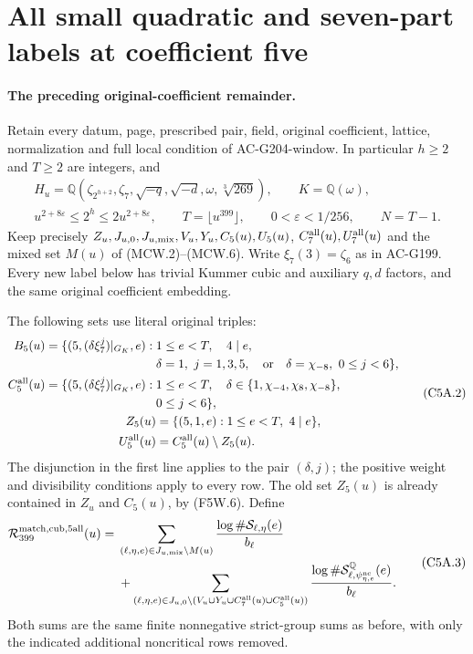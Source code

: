 \section{All small quadratic and seven-part labels at coefficient five}
\label{sec:coefficient-five-full-quadratic-window}

\paragraph{The preceding original-coefficient remainder.}
Retain every datum, page, prescribed pair, field, original coefficient,
lattice, normalization and full local condition of AC-G204-window.
In particular $h\geq2$ and $T\geq2$ are integers, and
\[
 \begin{gathered}
 H_u=\mathbb Q(\zeta_{2^{h+2}},\zeta_7,\sqrt{-q},\sqrt{-d},
              \omega,\sqrt[3]{269}),\qquad K=\mathbb Q(\omega),\\
 u^{2+8\varepsilon}\leq2^h\leq2u^{2+8\varepsilon},\qquad
 T=\lfloor u^{399}\rfloor,\qquad0<\varepsilon<1/256,\qquad N=T-1.
 \end{gathered}\tag{C5A.1}
\]
Keep precisely $Z_u,J_{u,0},J_{u,\rm mix},V_u,Y_u,C_5(u),U_5(u)$,
$C_7^{\rm all}(u),U_7^{\rm all}(u)$ and the mixed set $M(u)$
of (MCW.2)--(MCW.6). Write $\xi_7(3)=\zeta_6$ as in AC-G199.
Every new label below has trivial Kummer cubic and auxiliary
$q,d$ factors, and the same original coefficient embedding.

The following sets use literal original triples:
\[
 \begin{split}
 B_5(u)=\{(5,(\delta\xi_7^j)|_{G_K},e):{}&1\leq e<T,\quad4\mid e,\\
     &\delta=1,\ j=1,3,5,\quad\text{or}\quad
                    \delta=\chi_{-8},\ 0\leq j<6\},\\
 C_5^{\rm all}(u)=\{(5,(\delta\xi_7^j)|_{G_K},e):{}&1\leq e<T,\quad
                 \delta\in\{1,\chi_{-4},\chi_8,\chi_{-8}\},\\
                 &0\leq j<6\},\\
 Z_5(u)&=\{(5,1,e):1\leq e<T,\ 4\mid e\},\\
 U_5^{\rm all}(u)&=C_5^{\rm all}(u)\setminus Z_5(u).
 \end{split}\tag{C5A.2}
\]
The disjunction in the first line applies to the pair $(\delta,j)$;
the positive weight and divisibility conditions apply to every row.
The old set $Z_5(u)$ is already contained in $Z_u$ and $C_5(u)$,
by (F5W.6). Define
\[
 \begin{split}
 \mathcal R_{399}^{\rm match,cub,5all}(u)={}&
  \sum_{(\ell,\eta,e)\in J_{u,\rm mix}\setminus M(u)}
                 \frac{\log\#\mathcal S_{\ell,\eta}(e)}{b_\ell}\\
 &+\sum_{(\ell,\eta,e)\in
      J_{u,0}\setminus(V_u\cup Y_u\cup C_7^{\rm all}(u)
                                      \cup C_5^{\rm all}(u))}
       \frac{\log\#\mathcal S^{\mathbb Q}_{\ell,
                        \psi_{\eta,e}^{\rm nc}}(e)}{b_\ell}.
 \end{split}\tag{C5A.3}
\]
Both sums are the same finite nonnegative strict-group sums
as before, with only the indicated additional noncritical rows removed.

